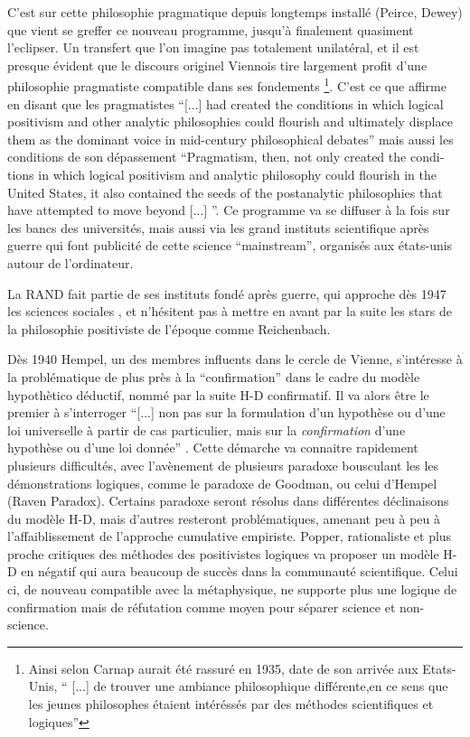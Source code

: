 C'est sur cette philosophie pragmatique depuis longtemps installé (Peirce, Dewey) que vient se greffer ce nouveau programme, jusqu'à finalement quasiment l'eclipser. Un transfert que l'on imagine pas totalement unilatéral, et il est presque évident que le discours originel Viennois tire largement profit d'une philosophie pragmatiste compatible dans ses fondements \footnote{ Ainsi selon \textcite[149]{Ouelbani2006} Carnap aurait été rassuré en 1935, date de son arrivée aux Etats-Unis, \enquote{ [...] de trouver une ambiance philosophique différente,en ce sens que les jeunes philosophes étaient intéréssés par des méthodes scientifiques et logiques}}. C'est ce que \textcite[123]{Wilson1995} affirme en disant que les pragmatistes \foreignquote{english}{[...] had created the conditions in which logical positivism and other analytic philosophies could flourish and ultimately displace them as the dominant voice in mid-century philosophical debates} mais aussi les conditions de son dépassement \foreignquote{english}{Pragmatism, then, not only created the conditions in which logical positivism and analytic philosophy could flourish in the United States, it also contained the seeds of the postanalytic philosophies that have attempted to move beyond [...] }. Ce programme va se diffuser à la fois sur les bancs des universités, mais aussi via les grand instituts scientifique après guerre qui font publicité de cette science \foreignquote{english}{mainstream}, organisés aux états-unis autour de l'ordinateur. 

La RAND fait partie de ses instituts fondé après guerre, qui approche dès 1947 les sciences sociales \autocite{Rand106}, et n'hésitent pas à mettre en avant par la suite les stars de la philosophie positiviste de l'époque comme Reichenbach. \autocite[384-385]{Barnes2011} 

Dès 1940 Hempel, un des membres influents dans le cercle de Vienne, s'intéresse à la problématique de plus près à la \enquote{confirmation} dans le cadre du modèle hypothètico déductif, nommé par la suite H-D confirmatif. Il va alors être le premier à s'interroger \enquote{[...] non pas sur la formulation d'un hypothèse ou d'une loi universelle à partir de cas particulier, mais sur la \textit{confirmation} d'une hypothèse ou d'une loi donnée} \autocite{Lecourt2012}. Cette démarche va connaitre rapidement plusieurs difficultés, avec l’avènement de plusieurs paradoxe bousculant les les démonstrations logiques, comme le paradoxe de Goodman, ou celui d'Hempel (Raven Paradox). Certains paradoxe seront résolus dans différentes déclinaisons du modèle H-D, mais d'autres resteront problématiques, amenant peu à peu à l'affaiblissement de l'approche cumulative empiriste. Popper, rationaliste et plus proche critiques des méthodes des positivistes logiques va proposer un modèle H-D en négatif qui aura beaucoup de succès dans la communauté scientifique. Celui ci, de nouveau compatible avec la métaphysique, ne supporte plus une logique de confirmation mais de réfutation comme moyen pour séparer science et non-science.

